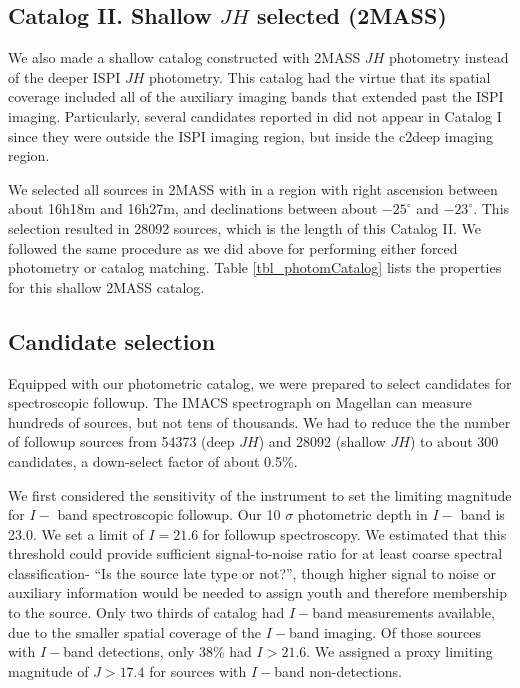 \documentclass[12pt,preprint]{aastex}
\begin{document}
\subsection{Catalog II. Shallow $JH$ selected (2MASS)}
We also made a shallow catalog constructed with 2MASS $JH$ photometry instead of the deeper ISPI $JH$ photometry.  This catalog had the virtue that its spatial coverage included all of the auxiliary imaging bands that extended past the ISPI imaging.  Particularly, several candidates reported in \citet{2010ApJ...720.1374H} did not appear in Catalog I since they were outside the ISPI imaging region, but inside the c2deep imaging region.

We selected all sources in 2MASS with in a region with right ascension between about 16h18m and 16h27m, and declinations between about $-25^{\circ}$ and $-23^{\circ}$.  This selection resulted in 28092 sources, which is the length of this Catalog II.  We followed the same procedure as we did above for performing either forced photometry or catalog matching.  Table \ref{tbl_photomCatalog} lists the properties for this shallow 2MASS catalog.


\subsection{Candidate selection}


Equipped with our photometric catalog, we were prepared to select candidates for spectroscopic followup.  The IMACS spectrograph on Magellan can measure hundreds of sources, but not tens of thousands.  We had to reduce the the number of followup sources from 54373 (deep $JH$) and 28092 (shallow $JH$) to about 300 candidates, a down-select factor of about 0.5\%.  

We first considered the sensitivity of the instrument to set the limiting magnitude for $I-$ band spectroscopic followup.  Our 10 $\sigma$ photometric depth in $I-$ band is 23.0.  We set a limit of $I=21.6$ for followup spectroscopy.  We estimated that this threshold could provide sufficient signal-to-noise ratio for at least coarse spectral classification- ``Is the source late type or not?'', though higher signal to noise or auxiliary information would be needed to assign youth and therefore membership to the source.  Only two thirds of catalog had $I-$band measurements available, due to the smaller spatial coverage of the $I-$band imaging.  Of those sources with $I-$band detections, only 38\% had $I>21.6$.  We assigned a proxy limiting magnitude of $J>17.4$ for sources with $I-$band non-detections.
\end{document}
